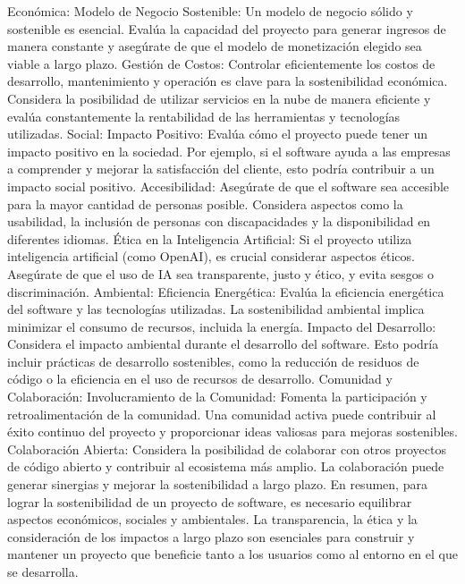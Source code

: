 Económica:
Modelo de Negocio Sostenible: Un modelo de negocio sólido y sostenible es esencial. 
Evalúa la capacidad del proyecto para generar ingresos de manera constante 
y asegúrate de que el modelo de monetización elegido sea viable a largo plazo.
Gestión de Costos: Controlar eficientemente los costos de desarrollo, 
mantenimiento y operación es clave para la sostenibilidad económica. 
Considera la posibilidad de utilizar servicios en la nube de manera eficiente 
y evalúa constantemente la rentabilidad de las herramientas y tecnologías utilizadas.
Social:
Impacto Positivo: Evalúa cómo el proyecto puede tener un impacto positivo en la sociedad. 
Por ejemplo, si el software ayuda a las empresas a comprender y mejorar la satisfacción del cliente, 
esto podría contribuir a un impacto social positivo.
Accesibilidad: Asegúrate de que el software sea accesible para la mayor cantidad de personas posible. 
Considera aspectos como la usabilidad, la inclusión de personas con discapacidades 
y la disponibilidad en diferentes idiomas.
Ética en la Inteligencia Artificial: 
Si el proyecto utiliza inteligencia artificial (como OpenAI), 
es crucial considerar aspectos éticos. 
Asegúrate de que el uso de IA sea transparente, justo y ético, y evita sesgos o discriminación.
Ambiental:
Eficiencia Energética: Evalúa la eficiencia energética del software y las tecnologías utilizadas. 
La sostenibilidad ambiental implica minimizar el consumo de recursos, incluida la energía.
Impacto del Desarrollo: Considera el impacto ambiental durante el desarrollo del software. 
Esto podría incluir prácticas de desarrollo sostenibles, 
como la reducción de residuos de código o la eficiencia en el uso de recursos de desarrollo.
Comunidad y Colaboración:
Involucramiento de la Comunidad: Fomenta la participación y retroalimentación de la comunidad. 
Una comunidad activa puede contribuir al éxito continuo del proyecto 
y proporcionar ideas valiosas para mejoras sostenibles.
Colaboración Abierta: Considera la posibilidad de colaborar con otros 
proyectos de código abierto y contribuir al ecosistema más amplio. 
La colaboración puede generar sinergias y mejorar la sostenibilidad a largo plazo.
En resumen, para lograr la sostenibilidad de un proyecto de software, 
es necesario equilibrar aspectos económicos, sociales y ambientales. 
La transparencia, la ética y la consideración de los impactos a largo plazo 
son esenciales para construir y mantener un proyecto que beneficie tanto 
a los usuarios como al entorno en el que se desarrolla.